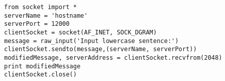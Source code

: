 \documentclass[varwidth=37.5em,crop]{standalone}
\begin{document}
\begin{verbatim}
from socket import *
serverName = 'hostname'
serverPort = 12000
clientSocket = socket(AF_INET, SOCK_DGRAM)
message = raw_input('Input lowercase sentence:')
clientSocket.sendto(message,(serverName, serverPort))
modifiedMessage, serverAddress = clientSocket.recvfrom(2048)
print modifiedMessage
clientSocket.close()  
\end{verbatim}
\end{document}
